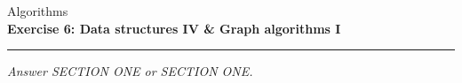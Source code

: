 \documentclass[10pt,a4paper,fleqn]{exam}
\begin{document}
\begin{center}
\Large Algorithms \\
\LARGE \textbf{Exercise 6: Data structures IV \& Graph algorithms I} \\
\end{center}

\hrule

\vspace{0.5cm}

\marksnotpoints
\pointsdroppedatright
\marksnotpoints
\marginpointname{ \points}




\begin{center}
\emph{Answer SECTION ONE or SECTION ONE.}
\end{center}
\end{document}
